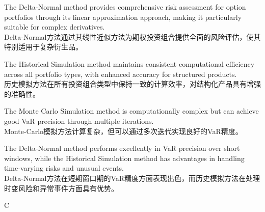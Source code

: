 \documentclass{article}
\begin{document}
\begin{choices}
    \item The Delta-Normal method provides comprehensive risk assessment for option portfolios through its linear approximation approach, making it particularly suitable for complex derivatives.\\
    Delta-Normal方法通过其线性近似方法为期权投资组合提供全面的风险评估，使其特别适用于复杂衍生品。
    
    \item The Historical Simulation method maintains consistent computational efficiency across all portfolio types, with enhanced accuracy for structured products.\\
    历史模拟方法在所有投资组合类型中保持一致的计算效率，对结构化产品具有增强的准确性。
    
    \item The Monte Carlo Simulation method is computationally complex but can achieve good VaR precision through multiple iterations.\\
    Monte-Carlo模拟方法计算复杂，但可以通过多次迭代实现良好的VaR精度。
    
    \item The Delta-Normal method performs excellently in VaR precision over short windows, while the Historical Simulation method has advantages in handling time-varying risks and unusual events.\\
    Delta-Normal方法在短期窗口期的VaR精度方面表现出色，而历史模拟方法在处理时变风险和异常事件方面具有优势。
\end{choices}

\begin{correctanswer}
    C
\end{correctanswer}
\end{document}
